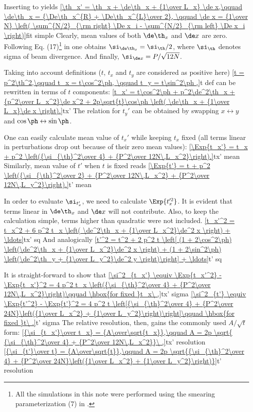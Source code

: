 Inserting  to  yields
\eqref{\th_x' = \th_x + \de\th_x + {1\over L_x} \de x,\qquad \de\th_x = {\De\th_x^{R} + \De\th_x^{L}\over 2}, \qquad \de x = {1\over N} \left( \sum^{N/2}_{\rm right} \De x_i - \sum^{N/2}_{\rm left} \De x_i \right)}{fit simple}
Clearly, mean values of both $\de\th_x$ and $\de x$ are zero. Following Eq. (17)\footnote{%
All the simulations in this note were performed using the smearing parameterization (7) in .
} in  one obtains $\si_{\de\th_x} = \si_\th / 2$, where $\si_\th$ denotes sigma of beam divergence. And finally, $\si_{\de x} = P / \sqrt{12N}$.

Taking into account definitions ($t$, $t_x$ and $t_y$ are considered as positive here)
\eqref{t = p^2\th^2,\qquad t_x = t\cos^2\ph, \qquad t_y = t\sin^2\ph ,}{t def}
 can be rewritten in terms of $t$ components:
\eqref{t_x' = t\cos^2\ph + p^2\de^2\th_x + {p^2\over L_x^2}\de x^2 + 2p\sqrt{t}\cos\ph \left( \de\th_x + {1\over L_x}\de x \right).}{tx'}
The relation for $t_y'$ can be obtained by swapping $x\leftrightarrow y$ and $\cos\ph\leftrightarrow\sin\ph$. 

One can easily calculate mean value of $t_x'$ while keeping $t_x$ fixed (all terms linear in perturbations drop out because of their zero mean values):
\eqref{\Exp{t_x'} = t_x + p^2 \left({\si_{\th}^2\over 4} + {P^2\over 12N\,L_x^2}\right).}{tx' mean}
Similarly, mean value of $t'$ when $t$ is fixed reads
\eqref{\Exp{t'} = t + p^2 \left({\si_{\th}^2\over 2} + {P^2\over 12N\,L_x^2} + {P^2\over 12N\,L_y^2}\right).}{t' mean}

In order to evaluate $\si_{t_x'}$, we need to calculate $\Exp{t_x'^2}$. It is evident that terms linear in $\de\th_x$ and $\de x$ will not contribute. Also, to keep the calculation simple, terms higher than quadratic were not included. 
\eqref{t_x'^2 = t_x^2 + 6 p^2 t_x \left( \de^2\th_x + {1\over L_x^2}\de^2 x \right) + \ldots}{tx' sq}
And analogically
\eqref{t'^2 = t^2 + 2 p^2 t \left[ (1 + 2\cos^2\ph) \left(\de^2\th_x + {1\over L_x^2}\de^2 x \right) + (1 + 2\sin^2\ph) \left(\de^2\th_y + {1\over L_y^2}\de^2 y \right)\right] + \ldots}{t' sq}

It is straight-forward to show that
\eqref{\si^2_{t_x'} \equiv \Exp{t_x'^2} - \Exp{t_x'}^2 = 4 p^2 t_x \left({\si_{\th}^2\over 4} + {P^2\over 12N\,L_x^2}\right)\qquad \hbox{for fixed }t_x\ ,}{tx' sigma}
\eqref{\si^2_{t'} \equiv \Exp{t'^2} - \Exp{t'}^2 = 4 p^2 t \left[{\si_{\th}^2\over 4} + {P^2\over 24N}\left({1\over L_x^2} + {1\over L_y^2}\right)\right]\qquad \hbox{for fixed }t\ .}{t' sigma}
The relative resolution, then, gains the commonly used $A/\sqrt{t}$ form:
\eqref{{\si_{t_x'}\over t_x}  = {A\over\sqrt{t_x}},\qquad A = 2p \sqrt{ {\si_{\th}^2\over 4} + {P^2\over 12N\,L_x^2}}\ ,}{tx' resolution}
\eqref{{\si_{t'}\over t}  = {A\over\sqrt{t}},\qquad A = 2p \sqrt{{\si_{\th}^2\over 4} + {P^2\over 24N}\left({1\over L_x^2} + {1\over L_y^2}\right)}}{t' resolution}

\iffalse
One may also define variable $\de$
\eqref{\de^2 = {(t_x' - t_x)^2\over t_x^2} \Rightarrow \sqrt{\Exp{\de^2}} = {\si_{t_x'}\over t_x}}{delta for tx}
\fi
